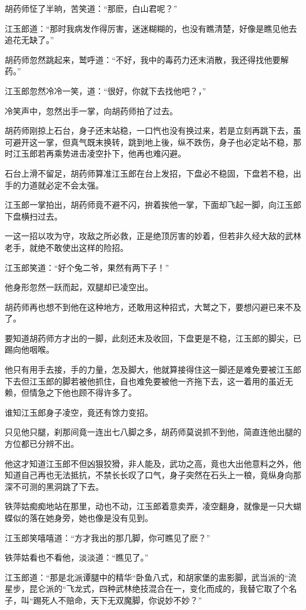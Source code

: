 \documentclass[12pt,oneside]{book}
\begin{document}
胡药师怔了半晌，苦笑道：``那麽，白山君呢？''

江玉郎道：``那时我病发作得厉害，迷迷糊糊的，也没有瞧清楚，好像是瞧见他去追花无缺了。''

胡药师忽然跳起来，鹫呼道：``不好，我中的毒药力还末消散，我还得找他要解药。''

江玉郎忽然冷冷一笑，道：``很好，你就下去找他吧？，''

冷笑声中，忽然出手一掌，向胡药师拍了过去。

胡药师刚掠上石台，身子还末站稳，一口忾也没有换过来，若是立刻再跳下去，虽可避开这一掌，但真气既末换转，跳到地上後，纵不跌伤，身子也必定站不稳，那时江玉郎若再乘势进击凌空扑下，他再也难闪避。

石台上滑不留足，胡药师算准江玉郎在台上发招，下盘必不稳固，下盘若不稳，出手的力道就必定不会太强。

江玉郎一掌拍出，胡药师竟不避不闪，拚着挨他一掌，下面却飞起一脚，向江玉郎下盘横扫过去。

一这一招以攻为守，攻敌之所必救，正是绝顶厉害的妙着，但若非久经大敌的武林老手，就绝不敢使出这样的险招。

江玉郎笑道：``好个兔二爷，果然有两下子！''

他身形忽然一跃而起，双腿却已凌空出。

胡药师再也想不到他在这种地方，还敢用这种招式，大鹫之下，要想闪避已来不及了。

要知道胡药师方才出的一脚，此刻还末及收回，下盘更是不稳，江玉郎的脚尖，已踢向他咽喉。

他只有用手去接，手的力量，怎及脚大，他就算接得住这一脚还是难免要被江玉郎下去但江玉郎的脚若被他抓住，自也难免要被他一齐拖下去，这一着用的虽近无赖，但情急之下他也顾不得许多了。

谁知江玉郎身子凌空，竟还有馀力变招。

只见他只腿，刹那间竟一连出七八脚之多，胡药师莫说抓不到他，简直连他出腿的方位都已分辨不出。

他这才知道江玉郎不但凶狠狡猾，非人能及，武功之高，竟也大出他意料之外，他知道自己再也无法抵抗，不禁长长叹了口气，身子突然在石头上一稂，竟纵身向那深不可测的黑洞跳了下去。

铁萍姑痴痴地站在那里，动也不动，江玉郎着意卖弄，凌空翻身，就像是一只大蝴蝶似的落在她身旁，她也像是没有见到。

江玉郎笑嘻嘻道：``方才我出的那几脚，你可瞧见了麽？''

铁萍姑看也不看他，淡淡道：``瞧见了。''

江玉郎道：``那是北派谭腿中的精华``卧鱼八式，和胡家堡的盅影脚，武当派的``流星步，昆仑派的``飞龙式，四种武林绝技混合在一，变化而成的，我替它取了个名子，叫``踢死人不赔命，天下无双魔脚，你说妙不妙？''
\end{document}
